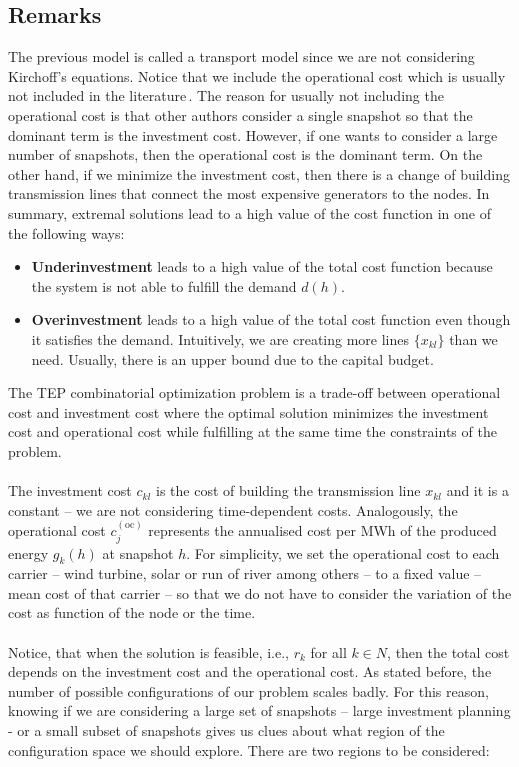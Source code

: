 \subsection{Remarks}
The previous model is called a transport model since we are not considering Kirchoff's equations. Notice that we include the operational cost which is usually not included in the literature\,\cite{Gomes2019}. The reason for usually not including the operational cost is that other authors consider a single snapshot so that the dominant term is the investment cost. However, if one wants to consider a large number of snapshots, then the operational cost is the dominant term. On the other hand, if we minimize the investment cost, then there is a change of building transmission lines that connect the most expensive generators to the nodes. In summary, extremal solutions lead to a high value of the cost function in one of the following ways:
\begin{itemize}
    \item \textbf{Underinvestment} leads to a high value of the total cost function because the system is not able to fulfill the demand $d(h)$.
    \item \textbf{Overinvestment} leads to a high value of the total cost function even though it satisfies the demand. Intuitively, we are creating more lines $\{x_{kl}\}$ than we need. Usually, there is an upper bound due to the capital budget.
\end{itemize}
The TEP combinatorial optimization problem is a trade-off between operational cost and investment cost where the optimal solution minimizes the investment cost and operational cost while fulfilling at the same time the constraints of the problem.\\\\
The investment cost $c_{kl}$ is the cost of building the transmission line $x_{kl}$ and it is a constant -- we are not considering time-dependent costs. Analogously, the operational cost $c_{j}^{(\text{oc})}$ represents the annualised cost per MWh of the produced energy $g_{k}(h)$ at snapshot $h$. For simplicity, we set the operational cost to each carrier -- wind turbine, solar or run of river among others -- to a fixed value -- mean cost of that carrier -- so that we do not have to consider the variation of the cost as function of the node or the time.\\\\
Notice, that when the solution is feasible, i.e., $r_k$ for all $k\in N$, then the total cost depends on the investment cost and the operational cost. As stated before, the number of possible configurations of our problem scales badly. For this reason, knowing if we are considering a large set of snapshots -- large investment planning - or a small subset of snapshots gives us clues about what region of the configuration space we should explore. There are two regions to be considered:
